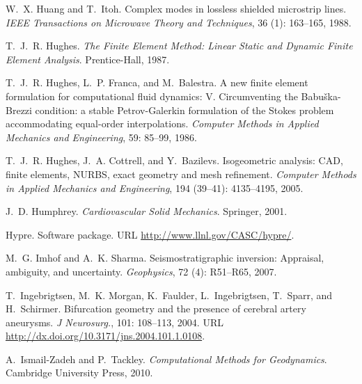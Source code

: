 \begin{thebibliography}{467}
W.~X. Huang and T.~Itoh.
\newblock Complex modes in lossless shielded microstrip lines.
\newblock \emph{IEEE Transactions on Microwave Theory and Techniques},
  36 (1): 163--165, 1988.

T.~J.~R. Hughes.
\newblock \emph{The Finite Element Method: Linear Static and Dynamic Finite
  Element Analysis}.
\newblock Prentice-Hall, 1987.

T.~J.~R. Hughes, L.~P. Franca, and M.~Balestra.
\newblock A new finite element formulation for computational fluid dynamics:
  {V}. {C}ircumventing the {B}abu\v{s}ka-{B}rezzi condition: a stable
  {P}etrov-{G}alerkin formulation of the {S}tokes problem accommodating
  equal-order interpolations.
\newblock \emph{Computer Methods in Applied Mechanics and Engineering},
  59: 85--99, 1986.

T.~J.~R. Hughes, J.~A. Cottrell, and Y.~Bazilevs.
\newblock Isogeometric analysis: {CAD}, finite elements, {NURBS}, exact
  geometry and mesh refinement.
\newblock \emph{Computer Methods in Applied Mechanics and Engineering},
  194 (39--41): 4135--4195, 2005.

J.~D. Humphrey.
\newblock \emph{Cardiovascular Solid Mechanics}.
\newblock Springer, 2001.

Hypre.
\newblock Software package.
\newblock URL \url{http://www.llnl.gov/CASC/hypre/}.

M.~G. Imhof and A.~K. Sharma.
\newblock Seismostratigraphic inversion: Appraisal, ambiguity, and uncertainty.
\newblock \emph{Geophysics}, 72 (4): R51--R65, 2007.

T.~Ingebrigtsen, M.~K. Morgan, K.~Faulder, L.~Ingebrigtsen, T.~Sparr, and
  H.~Schirmer.
\newblock Bifurcation geometry and the presence of cerebral artery aneurysms.
\newblock \emph{J Neurosurg.}, 101: 108--113, 2004.
\newblock URL \url{http://dx.doi.org/10.3171/jns.2004.101.1.0108}.

A.~Ismail-Zadeh and P.~Tackley.
\newblock \emph{Computational Methods for Geodynamics}.
\newblock Cambridge University Press, 2010.


\end{thebibliography}
